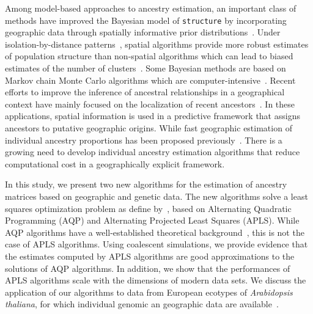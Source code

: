   Among model-based approaches to ancestry estimation, an important class of methods have improved the Bayesian model of {\tt structure} by incorporating geographic data through spatially informative prior distributions~\citep{Chen2007, Corander2008}. Under isolation-by-distance patterns~\citep{Wright1943, Malecot1948}, spatial algorithms provide more robust estimates of population structure than non-spatial algorithms which can lead to biased estimates of the number of clusters~\citep{Durand2009}.  Some Bayesian methods are based on Markov chain Monte Carlo algorithms which are computer-intensive~\citep{Francois2010}. Recent efforts to improve the inference of ancestral relationships in a geographical context have mainly focused on the localization of recent ancestors~\citep{Baran2013, Lao2014, Yang2014}. In these applications, spatial information is used in a predictive framework that assigns ancestors to putative geographic origins. While fast geographic estimation of individual ancestry proportions has been proposed previously~\citep{Caye2016}. There is a growing need to develop individual ancestry estimation algorithms that reduce computational cost in a geographically explicit framework. 

In this study, we present two new algorithms for the estimation of ancestry matrices based on geographic and genetic data. The new algorithms solve a least squares optimization problem as define by~\cite{Caye2016}, based on Alternating Quadratic Programming  (AQP) and Alternating Projected Least Squares (APLS). While AQP algorithms have a well-established theoretical background~\citep{Bertsekas1995}, this is not the case of APLS algorithms. Using coalescent simulations, we provide evidence that the estimates computed by APLS algorithms are good approximations to the solutions of AQP algorithms. In addition, we show that the performances of APLS algorithms scale with the dimensions of modern data sets. We discuss the application of our algorithms to data from European ecotypes of {\it Arabidopsis thaliana}, for which individual genomic an geographic data are available~\citep{Horton2012}. 



